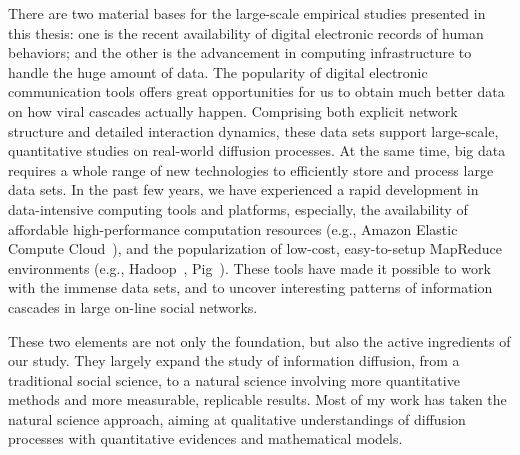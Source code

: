 \documentclass[phd,tocprelim]{cornell}
\begin{document}
There are two material bases for the large-scale empirical studies presented in this thesis: one is the recent availability of digital electronic records of human behaviors; and the other is the advancement in computing infrastructure to handle the huge amount of data. The popularity of digital electronic communication tools offers great opportunities for us to obtain much better data on how viral cascades actually happen. Comprising both explicit network structure and detailed interaction dynamics, these data sets support large-scale, quantitative studies on real-world diffusion processes. At the same time, big data requires a whole range of new technologies to efficiently store and process large data sets. In the past few years, we have experienced a rapid development in data-intensive computing tools and platforms, especially, the availability of affordable high-performance computation resources (e.g., Amazon Elastic Compute Cloud~\cite{amazon-ec2}), and the popularization of low-cost, easy-to-setup MapReduce~\cite{Dean:2004} environments (e.g., Hadoop~\cite{hadoop}, Pig~\cite{pig}). These tools have made it possible to work with the immense data sets, and to uncover interesting patterns of information cascades in large on-line social networks.

These two elements are not only the foundation, but also the active ingredients of our study. They largely expand the study of information diffusion, from a 
traditional social science, to a natural science involving  more quantitative methods and more measurable, replicable results. Most of my work has taken the natural science approach, aiming at qualitative understandings of diffusion processes with quantitative evidences and mathematical models.




\end{document}
